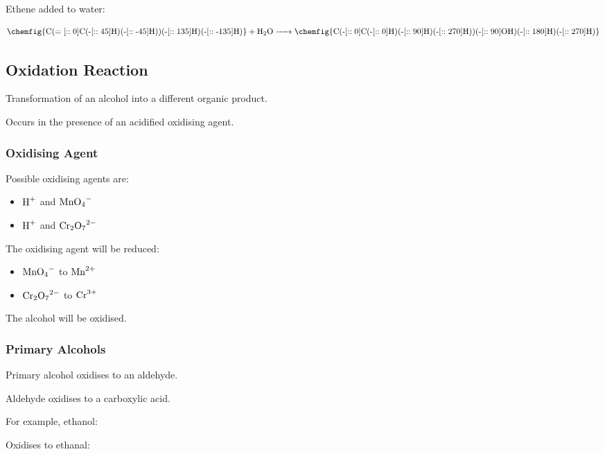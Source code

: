 \documentclass[a4paper,11pt]{article}
\begin{document}
Ethene added to water:

$$
\ce{\chemfig{C(=[::0]C(-[::45]H)(-[::-45]H))(-[::135]H)(-[::-135]H)} + H2O ->
\chemfig{C(-[::0]C(-[::0]H)(-[::90]H)(-[::270]H))(-[::90]OH)(-[::180]H)(-[::270]H)}}
$$


\subsection{Oxidation Reaction}

Transformation of an alcohol into a different organic product.

Occurs in the presence of an acidified oxidising agent.


\subsubsection{Oxidising Agent}

Possible oxidising agents are:

\begin{itemize}
\item $\ce{H+}$ and $\ce{MnO4-}$
\item $\ce{H+}$ and $\ce{Cr2O7^2-}$
\end{itemize}

The oxidising agent will be reduced:

\begin{itemize}
\item $\ce{MnO4-}$ to $\ce{Mn^2+}$
\item $\ce{Cr2O7^2-}$ to $\ce{Cr^3+}$
\end{itemize}

The alcohol will be oxidised.


\subsubsection{Primary Alcohols}

Primary alcohol oxidises to an aldehyde.

Aldehyde oxidises to a carboxylic acid.

For example, ethanol:

\begin{center}
\end{center}

Oxidises to ethanal:

\begin{center}
\end{center}
\end{document}
